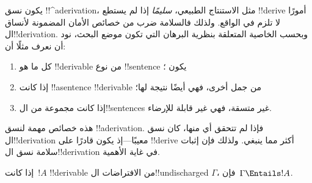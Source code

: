 \documentclass[../../../include/open-logic-section]{subfiles}
\begin{document}
      {}
      {}
      

\begin{explain}
يكون نسق !!^a{derivation}، مثل الاستنتاج الطبيعي، \emph{سليمًا} إذا لم
يستطع !!{derive} أمورًا لا تلزم في الواقع. ولذلك فالسلامة ضرب من خصائص
الأمان المضمونة لأنساق ال!!{derivation}. وبحسب الخاصية المتعلقة بنظرية
البرهان التي تكون موضع البحث، نود أن نعرف مثلًا أن:
\begin{enumerate}
\item كل ما هو !!{derivable} من نوع !!{sentence} يكون ؛
\item إذا كانت !!a{sentence} !!{derivable} من جمل أخرى، فهي أيضًا
  نتيجة لها؛
\item إذا كانت مجموعة من ال!!{sentence}s غير متسقة، فهي غير قابلة
  للإرضاء.
\end{enumerate}
هذه خصائص مهمة لنسق !!a{derivation}. فإذا لم تتحقق أي منها، كان نسق
ال!!{derivation} معيبًا---إذ يكون قادرًا على !!{derive} أكثر مما ينبغي.
ولذلك فإن إثبات سلامة نسق ال!!{derivation} في غاية الأهمية.
\end{explain}

\begin{thm}[السلامة]
إذا كانت~$!A$ !!{derivable} من الافتراضات ال!!{undischarged}
$\Gamma$، فإن~$\Gamma \Entails !A$.
\end{thm}
\end{document}
